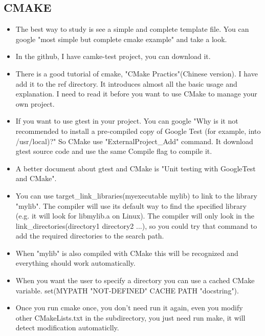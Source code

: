 \documentclass[a4paper,12pt,twoside]{book}
\begin{document}
\subsection{CMAKE}
\begin{itemize}
		\item The best way to study is see a simple and complete template file. You can google "most simple but complete cmake example" and take a look.  
		
		\item In the github, I have camke-test project, you can download it.
		
		\item There is a good tutorial of cmake, "CMake Practics"(Chinese version). I have add it to the ref directory. It introduces almost all the basic usage and explanation. I need to read it before you want to use CMake to manage your own project.
		\item If you want to use gtest in your project. You can google "Why is it not recommended to install a pre-compiled copy of Google Test (for example, into /usr/local)?" So CMake use "ExternalProject\_Add" command. It download gtest source code and use the same Compile flag to compile it. 
		
		\item A better document about gtest and CMake is "Unit testing with GoogleTest and CMake". 
		
		\item You can use target\_link\_libraries(myexecutable mylib) to link to the library "mylib". The compiler will use its default way to find the specified library (e.g. it will look for libmylib.a on Linux). The compiler will only look in the link\_directories(directory1 directory2 ...), so you could try that command to add the required directories to the search path.

\item When "mylib" is also compiled with CMake this will be recognized and everything should work automatically.

\item When you want the user to specify a directory you can use a cached CMake variable. set(MYPATH "NOT-DEFINED" CACHE PATH "docstring").

\item Once you run cmake once, you don't need run it again, even you modify other CMakeLists.txt in the subdirectory, you just need run make, it will detect modification automaticlly. 


\end{itemize}
\end{document}

